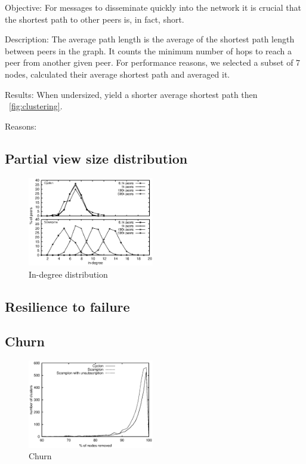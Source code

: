 \begin{asparadesc}
\item[Objective:] 
    For messages to disseminate quickly into the network it is crucial 
    that the shortest path to other peers is, in fact, short.
\item[Description:] The average path length is the average of the shortest path
  length between peers in the graph. It counts the minimum number of hops to
  reach a peer from another given peer.
  For performance reasons, we selected a subset of 7 nodes, calculated their
  average shortest path and averaged it.
\item[Results:]
When undersized, \CYCLON{} yield a shorter average shortest path then \SCAMPLON{}~\ref{fig:clustering}.
\item[Reasons:]
\end{asparadesc}

\subsection{Partial view size distribution}
\begin{figure}
    \centering
    \includegraphics[width=0.49\textwidth]{img/histo.eps}
    \caption{In-degree distribution}
    \label{fig:histo}
\end{figure}

\subsection{Resilience to failure}

\subsection{Churn}
\begin{figure}
    \centering
    \includegraphics[width=0.49\textwidth]{img/churn.eps}
    \caption{Churn}
    \label{fig:churn}
\end{figure}

